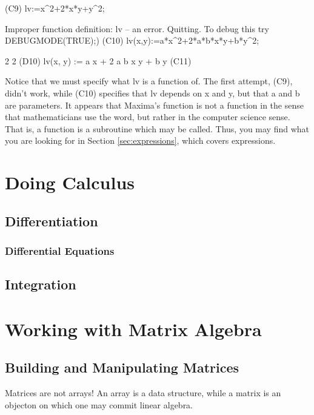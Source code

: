 \documentclass[titlepage]{article}
\begin{document}
\begin{verbatimtab}

(C9) lv:=x^2+2*x*y+y^2;

Improper function definition:
lv
 -- an error.  Quitting.  To debug this try DEBUGMODE(TRUE);)
(C10) lv(x,y):=a*x^2+2*a*b*x*y+b*y^2;

         2          2
(D10)         lv(x, y) := a x  + 2 a b x y + b y
(C11)

\end{verbatimtab}

Notice that we must specify what lv is a function of.  The first
attempt, (C9), didn't work, while (C10) specifies that lv depends on x
and y, but that a and b are parameters.  It appears that Maxima's
function is not a function in the sense that mathematicians use the
word, but rather in the computer science sense.  That is, a function is
a subroutine which may be called.  Thus, you may find what you are
looking for in Section \vref{sec:expressions}, which covers expressions.

\section{Doing Calculus}

\subsection{Differentiation}

\subsubsection{Differential Equations}

\subsection{Integration}



\section{Working with Matrix Algebra}

\subsection{Building and Manipulating Matrices}

Matrices are not arrays!  An array is a data structure, while a matrix
is an objecton on which one may commit linear algebra.
\end{document}
